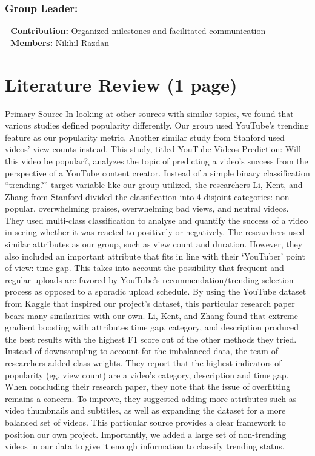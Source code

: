 \documentclass{article}
\begin{document}
\subsubsection*{Group Leader:}
- \textbf{Contribution:} Organized milestones and facilitated communication \\
- \textbf{Members:} Nikhil Razdan

\section*{Literature Review (1 page)}
Primary Source
In looking at other sources with similar topics, we found that various studies defined popularity differently. Our group used YouTube’s trending feature as our popularity metric. Another similar study from Stanford used videos’ view counts instead. This study, titled YouTube Videos Prediction: Will this video be popular?, analyzes the topic of predicting a video’s success from the perspective of a YouTube content creator. Instead of a simple binary classification “trending?” target variable like our group utilized, the researchers Li, Kent, and Zhang from Stanford divided the classification into 4 disjoint categories: non-popular, overwhelming praises, overwhelming bad views, and neutral videos. They used multi-class classification to analyse and quantify the success of a video in seeing whether it was reacted to positively or negatively. The researchers used similar attributes as our group, such as view count and duration. However, they also included an important attribute that fits in line with their ‘YouTuber’ point of view: time gap. This takes into account the possibility that frequent and regular uploads are favored by YouTube’s recommendation/trending selection process as opposed to a sporadic upload schedule. By using the YouTube dataset from Kaggle that inspired our project’s dataset, this particular research paper bears many similarities with our own. 
Li, Kent, and Zhang found that extreme gradient boosting with attributes {time gap, category, and description} produced the best results with the highest F1 score out of the other methods they tried. Instead of downsampling to account for the imbalanced data, the team of researchers added class weights. They report that the highest indicators of popularity (eg. view count) are a video’s category, description and time gap. When concluding their research paper, they note that the issue of overfitting remains a concern. To improve, they suggested adding more attributes such as video thumbnails and subtitles, as well as expanding the dataset for a more balanced set of videos. This particular source provides a clear framework to position our own project. Importantly, we added a large set of non-trending videos in our data to give it enough information to classify trending status.
\end{document}
